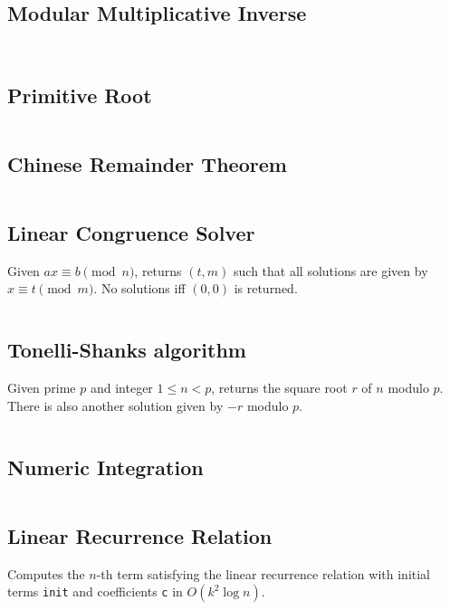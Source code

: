 \documentclass[8pt,a4paper,landscape,oneside]{amsart}
\newcommand{\code}[1]{\inputminted[fontsize=\normalsize,baselinestretch=1]{cpp}{_code/#1}}
\newif\ifverbose
\begin{document}
\begin{multicols*}{3}
    \subsection{Modular Multiplicative Inverse}
        \ifverbose
        A function to find a modular multiplicative inverse. Alternatively use
        \texttt{mod\_{}pow(a,m-2,m)} when $m$ is prime.
        \fi
        \code{mathematics/mod_inv.cpp}
        \ifverbose
        A sieve version:
        \fi
        \code{mathematics/mod_inv_sieve.cpp}

    \subsection{Primitive Root}
        \code{mathematics/primitive_root.cpp}

    \subsection{Chinese Remainder Theorem}
        \ifverbose
        An implementation of the Chinese Remainder Theorem.
        \fi
        \code{mathematics/crt.cpp}

    \subsection{Linear Congruence Solver}
        Given $ax \equiv b \pmod{n}$, returns $(t,m)$ such that all solutions
        are given by $x\equiv t\pmod{m}$. No solutions iff $(0,0)$ is returned.
        \code{mathematics/linear_congruence.cpp}

    \subsection{Tonelli-Shanks algorithm}
        Given prime $p$ and integer $1\leq n<p$, returns the square root $r$ of
        $n$ modulo $p$. There is also another solution given by $-r$ modulo
        $p$.
        \code{mathematics/tonelli_shanks.cpp}

    \subsection{Numeric Integration}
        \ifverbose
        Numeric integration using Simpson's rule.
        \fi
        \code{mathematics/numeric_integration.cpp}

    \subsection{Linear Recurrence Relation}
        Computes the $n$-th term satisfying the linear recurrence relation with
        initial terms \texttt{init} and coefficients \texttt{c} in $O(k^2\log n)$.
        \code{mathematics/linear_recurrence.cpp}


\end{multicols*}
\end{document}
